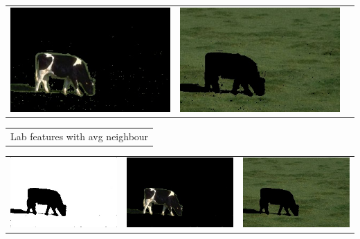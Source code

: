 \documentclass{article}
\begin{document}
\begin{center}
\begin{tabular}{c c c}
 \includegraphics[width=.4\linewidth]{../image-segmentation/output/add-Lab-neighbor-diff-feature/cow_seg1.jpg} & \includegraphics[width=.4\linewidth]{../image-segmentation/output/add-Lab-neighbor-diff-feature/cow_seg2.jpg} \\
  
 \end{tabular}
 \begin{tabular}{c}

Lab features with avg neighbour \\
\end{tabular}
 \begin{tabular}{c c c} 

 \includegraphics[width=.4\linewidth]{../image-segmentation/output/add-Lab-neighbor-avg-feature/cow_mask.jpg} & 
 
 \includegraphics[width=.4\linewidth]{../image-segmentation/output/add-Lab-neighbor-avg-feature/cow_seg1.jpg} & \includegraphics[width=.4\linewidth]{../image-segmentation/output/add-Lab-neighbor-avg-feature/cow_seg2.jpg} \\
  
 \end{tabular}
 
 
\end{center}
\end{document}

